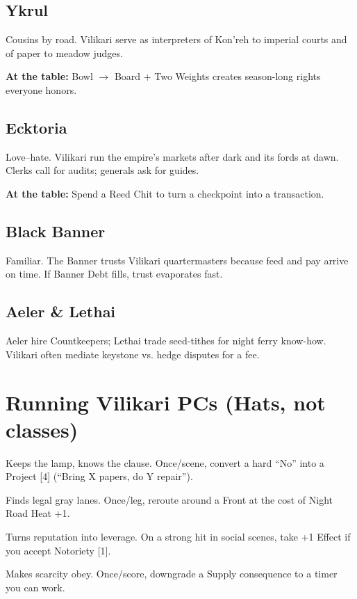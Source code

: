 \documentclass[11pt,letterpaper]{article}
\begin{document}
\subsection{Ykrul}

Cousins by road. Vilikari serve as interpreters of Kon'reh to imperial courts and of paper to meadow judges.

\textbf{At the table:} Bowl $\rightarrow$ Board + Two Weights creates season-long rights everyone honors.

\subsection{Ecktoria}

Love--hate. Vilikari run the empire's markets after dark and its fords at dawn. Clerks call for audits; generals ask for guides.

\textbf{At the table:} Spend a Reed Chit to turn a checkpoint into a transaction.

\subsection{Black Banner}

Familiar. The Banner trusts Vilikari quartermasters because feed and pay arrive on time. If Banner Debt fills, trust evaporates fast.

\subsection{Aeler \& Lethai}

Aeler hire Countkeepers; Lethai trade seed-tithes for night ferry know-how. Vilikari often mediate keystone vs. hedge disputes for a fee.

\section{Running Vilikari PCs (Hats, not classes)}

\begin{description}[leftmargin=*]
\item[Key-Bearer] Keeps the lamp, knows the clause. Once/scene, convert a hard ``No'' into a Project [4] (``Bring X papers, do Y repair'').
\item[Road-Cutter] Finds legal gray lanes. Once/leg, reroute around a Front at the cost of Night Road Heat +1.
\item[Bargainer] Turns reputation into leverage. On a strong hit in social scenes, take +1 Effect if you accept Notoriety [1].
\item[Quartermaster] Makes scarcity obey. Once/score, downgrade a Supply consequence to a timer you can work.
\end{description}
\end{document}
